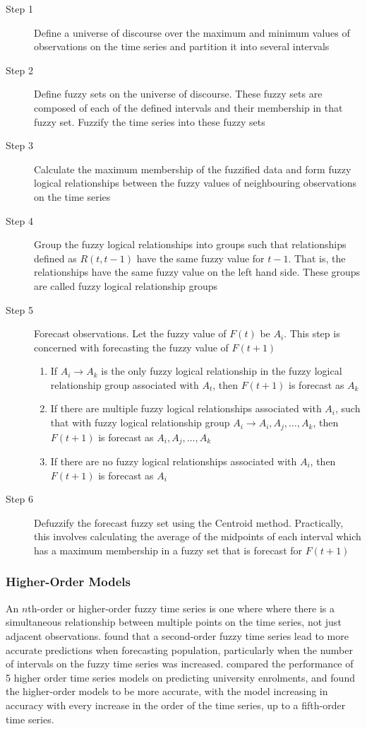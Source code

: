 \documentclass{article}
\theoremstyle{definition}
\begin{document}
\begin{description}
\item[Step 1] Define a universe of discourse over the maximum and minimum values of observations on the time series and partition it into several intervals
\item[Step 2] Define fuzzy sets on the universe of discourse. These fuzzy sets are composed of each of the defined intervals and their membership in that fuzzy set. Fuzzify the time series into these fuzzy sets
\item[Step 3] Calculate the maximum membership of the fuzzified data and form fuzzy logical relationships between the fuzzy values of neighbouring observations on the time series
\item[Step 4] Group the fuzzy logical relationships into groups such that relationships defined as $R(t,t-1)$ have the same fuzzy value for $t-1$. That is, the relationships have the same fuzzy value on the left hand side. These groups are called fuzzy logical relationship groups
\item[Step 5] Forecast observations. Let the fuzzy value of $F(t)$ be $A_i$. This step is concerned with forecasting the fuzzy value of $F(t+1)$
\begin{enumerate}
\item If  $A_i \rightarrow A_k$ is the only fuzzy logical relationship in the fuzzy logical relationship group associated with $A_t$, then $F(t+1)$ is forecast as $A_k$ 
\item If there are multiple fuzzy logical relationships associated with $A_i$, such that with fuzzy logical relationship group $A_i \rightarrow A_{i}, A_{j}, \ldots, A_{k}$, then $F(t+1)$ is forecast as $A_{i}, A_{j}, \ldots, A_{k}$
\item If there are no fuzzy logical relationships associated with $A_i$, then $F(t+1)$ is forecast as $A_i$
\end{enumerate}
\item[Step 6] Defuzzify the forecast fuzzy set using the Centroid method. Practically, this involves calculating the average of the midpoints of each interval which has a maximum membership in a fuzzy set that is forecast for $F(t+1)$
\end{description}

\subsubsection{Higher-Order Models}

An $n$th-order or higher-order fuzzy time series is one where where there is a simultaneous relationship between multiple points on the time series, not just adjacent observations. \cite{tsai1999study} found that a second-order fuzzy time series lead to more accurate predictions when forecasting population, particularly when the number of intervals on the fuzzy time series was increased. \cite{tsai2000forecasting} compared the performance of 5 higher order time series models on predicting university enrolments, and found the higher-order models to be more accurate, with the model increasing in accuracy with every increase in the order of the time series, up to a fifth-order time series.
\end{document}
